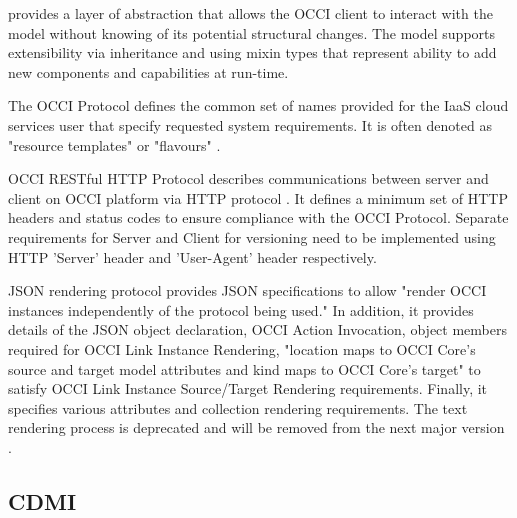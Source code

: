      provides a layer of abstraction that allows the OCCI client
     to interact with the model without knowing of its potential
     structural changes. The model supports extensibility via
     inheritance and using mixin types that represent ability to
     add new components and capabilities at run-time.
     \cite{nyren-edmonds-papaspyrou-2016}

     The OCCI Protocol defines the common set of names provided
     for the IaaS cloud services user that specify requested
     system requirements. It is often denoted as "resource
     templates" or "flavours"   \cite{drescher-parak-wallom-2015}.

     OCCI RESTful HTTP Protocol describes communications between
     server and client on OCCI platform via HTTP protocol
     \cite{nyren-edmonds-metsch-2016}. It defines a minimum set of HTTP
     headers and status codes to ensure compliance with the
     OCCI Protocol. Separate requirements for Server and Client
     for versioning need to be implemented using HTTP 'Server'
     header and 'User-Agent' header respectively.

     JSON rendering  \cite{nyren-feldhaus-parak-2016} protocol provides
     JSON specifications to allow "render OCCI instances
     independently of the protocol being used." In addition, it
     provides details of the JSON object declaration, OCCI Action
     Invocation, object members required for OCCI Link Instance
     Rendering, "location maps to OCCI Core's source and target
     model attributes and kind maps to OCCI Core's target" to
     satisfy OCCI Link Instance Source/Target Rendering requirements.
     Finally, it specifies various attributes and collection
     rendering requirements.
     The text rendering process is deprecated and will be
     removed from the next major version  \cite{edmonds-metsch-2016}.
	 
\subsection{CDMI}

